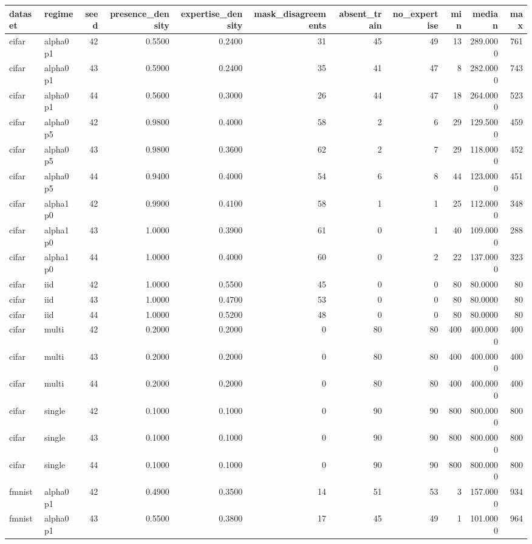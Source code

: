 \begin{tabular}{llrrrrrrrrr}
\toprule
dataset & regime & seed & presence\_density & expertise\_density & mask\_disagreements & absent\_train & no\_expertise & min & median & max \\
\midrule
cifar & alpha0p1 & 42 & 0.5500 & 0.2400 & 31 & 45 & 49 & 13 & 289.0000 & 761 \\
cifar & alpha0p1 & 43 & 0.5900 & 0.2400 & 35 & 41 & 47 & 8 & 282.0000 & 743 \\
cifar & alpha0p1 & 44 & 0.5600 & 0.3000 & 26 & 44 & 47 & 18 & 264.0000 & 523 \\
cifar & alpha0p5 & 42 & 0.9800 & 0.4000 & 58 & 2 & 6 & 29 & 129.5000 & 459 \\
cifar & alpha0p5 & 43 & 0.9800 & 0.3600 & 62 & 2 & 7 & 29 & 118.0000 & 452 \\
cifar & alpha0p5 & 44 & 0.9400 & 0.4000 & 54 & 6 & 8 & 44 & 123.0000 & 451 \\
cifar & alpha1p0 & 42 & 0.9900 & 0.4100 & 58 & 1 & 1 & 25 & 112.0000 & 348 \\
cifar & alpha1p0 & 43 & 1.0000 & 0.3900 & 61 & 0 & 1 & 40 & 109.0000 & 288 \\
cifar & alpha1p0 & 44 & 1.0000 & 0.4000 & 60 & 0 & 2 & 22 & 137.0000 & 323 \\
cifar & iid & 42 & 1.0000 & 0.5500 & 45 & 0 & 0 & 80 & 80.0000 & 80 \\
cifar & iid & 43 & 1.0000 & 0.4700 & 53 & 0 & 0 & 80 & 80.0000 & 80 \\
cifar & iid & 44 & 1.0000 & 0.5200 & 48 & 0 & 0 & 80 & 80.0000 & 80 \\
cifar & multi & 42 & 0.2000 & 0.2000 & 0 & 80 & 80 & 400 & 400.0000 & 400 \\
cifar & multi & 43 & 0.2000 & 0.2000 & 0 & 80 & 80 & 400 & 400.0000 & 400 \\
cifar & multi & 44 & 0.2000 & 0.2000 & 0 & 80 & 80 & 400 & 400.0000 & 400 \\
cifar & single & 42 & 0.1000 & 0.1000 & 0 & 90 & 90 & 800 & 800.0000 & 800 \\
cifar & single & 43 & 0.1000 & 0.1000 & 0 & 90 & 90 & 800 & 800.0000 & 800 \\
cifar & single & 44 & 0.1000 & 0.1000 & 0 & 90 & 90 & 800 & 800.0000 & 800 \\
fmnist & alpha0p1 & 42 & 0.4900 & 0.3500 & 14 & 51 & 53 & 3 & 157.0000 & 934 \\
fmnist & alpha0p1 & 43 & 0.5500 & 0.3800 & 17 & 45 & 49 & 1 & 101.0000 & 964 \\

\end{tabular}
